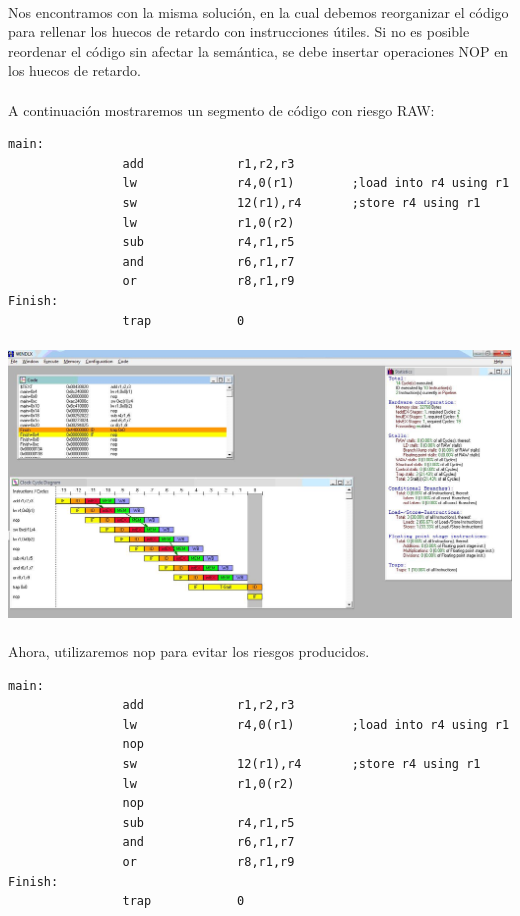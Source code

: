 \documentclass[a4paper,11pt]{article}
\begin{document}
\begin{enumerate}
\paragraph{}
Nos encontramos con la misma soluci\'on, en la cual debemos reorganizar el c\'odigo para rellenar los huecos de retardo con instrucciones \'utiles.
Si no es posible reordenar el c\'odigo sin afectar la sem\'antica, se debe insertar operaciones NOP en los huecos de retardo.

\paragraph{}
A continuaci\'on mostraremos un segmento de c\'odigo con riesgo RAW:


\begin{center}
\begin{verbatim}
main:
                add             r1,r2,r3
                lw              r4,0(r1)        ;load into r4 using r1
                sw              12(r1),r4       ;store r4 using r1
                lw              r1,0(r2)
                sub             r4,r1,r5
                and             r6,r1,r7
                or              r8,r1,r9
Finish:       
                trap            0
\end{verbatim}
\end{center}

\paragraph{}
\centering
\includegraphics[width=470pt]{punto5-1.JPG}


\paragraph{}
Ahora, utilizaremos nop para evitar los riesgos producidos.
\begin{center}
\begin{verbatim}
main:
                add             r1,r2,r3
                lw              r4,0(r1)        ;load into r4 using r1
				nop
                sw              12(r1),r4       ;store r4 using r1
                lw              r1,0(r2)
				nop
                sub             r4,r1,r5
                and             r6,r1,r7
                or              r8,r1,r9
Finish:       
                trap            0
\end{verbatim}
\end{center}


\end{enumerate}
\end{document}
